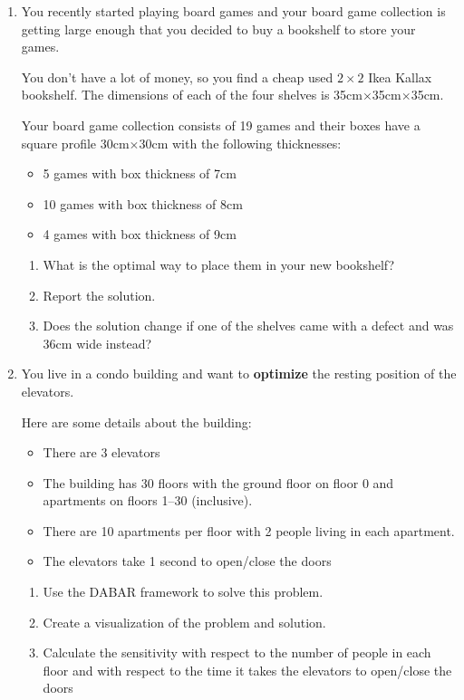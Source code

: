 \begin{enumerate}
	\item\label{q1} You recently started playing board games and your board game collection is getting large enough that you decided to buy a bookshelf to store your games. 
	
	You don't have a lot of money, so you find a cheap used $2 \times 2$ Ikea Kallax bookshelf.
	The dimensions of each of the four shelves is 35cm$\times$35cm$\times$35cm.
	
	Your board game collection consists of 19 games and their boxes have a square profile 30cm$\times$30cm with the following thicknesses:
	\begin{itemize}
		\item 5 games with box thickness of 7cm
		\item 10 games with box thickness of 8cm
		\item 4 games with box thickness of 9cm
	\end{itemize}

	\begin{enumerate}
		\item What is the optimal way to place them in your new bookshelf?

		\item Report the solution.

		\item Does the solution change if one of the shelves came with a defect and was 36cm wide instead?
	\end{enumerate}


\vfil 

\item \label{q2} You live in a condo building and want to \textbf{optimize} the resting position of the elevators.

	Here are some details about the building:
	\begin{itemize}
		\item There are 3 elevators
		\item The building has 30 floors with the ground floor on floor 0 and apartments on floors 1--30 (inclusive).
		\item There are 10 apartments per floor with 2 people living in each apartment.
		\item The elevators take 1 second to open/close the doors
	\end{itemize}

	\begin{enumerate}
		\item Use the DABAR framework to solve this problem.
		\item Create a visualization of the problem and solution.
		\item Calculate the sensitivity with respect to the number of people in each floor and with respect to the time it takes the elevators to open/close the doors
	\end{enumerate}
	

\end{enumerate}
